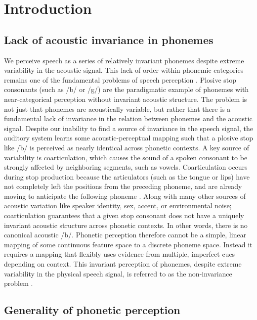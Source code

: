 \documentclass[preprint, NumberedRefs]{JASAnew}\usepackage[]{graphicx}\usepackage[]{color}
\begin{document}
\section{Introduction}
\subsection{Lack of acoustic invariance in phonemes}

We perceive speech as a series of relatively invariant phonemes despite extreme variability in the acoustic signal. This lack of order within phonemic categories remains one of the fundamental problems of speech perception \cite{Sussman1998}. Plosive stop consonants (such as /b/ or /g/) are the paradigmatic example of phonemes with near-categorical perception\cite{Holt2010,Kronrod2016a,LIBERMAN1957} without invariant acoustic structure\cite{Elman1988,Kluender1987}. The problem is not just that phonemes are acoustically variable, but rather that there is a fundamental lack of invariance in the relation between phonemes and the acoustic signal\cite{Kluender1987}. Despite our inability to find a source of invariance in the speech signal, the auditory system learns some acoustic-perceptual mapping such that a plosive stop like /b/ is perceived as nearly identical across phonetic contexts. A key source of variability is coarticulation, which causes the sound of a spoken consonant to be strongly affected by neighboring segments, such as vowels. Coarticulation occurs during stop production because the articulators (such as the tongue or lips) have not completely left the positions from the preceding phoneme, and are already moving to anticipate the following phoneme \cite{Liberman1967,Farnetani1990}.  Along with many other sources of acoustic variation like speaker identity, sex, accent, or environmental noise; coarticulation guarantees that a given stop consonant does not have a uniquely invariant acoustic structure across phonetic contexts. In other words, there is no canonical acoustic /b/\cite{Liberman1967,Holt2010}. Phonetic perception therefore cannot be a simple, linear mapping of some continuous feature space to a discrete phoneme space. Instead it requires a mapping that flexibly uses evidence from multiple, imperfect cues depending on context\cite{Holt2010, Diehl2004}. This invariant perception of phonemes, despite extreme variability in the physical speech signal, is referred to as the non-invariance problem \cite{Perkell1986}.

\subsection{Generality of phonetic perception}
\end{document}
